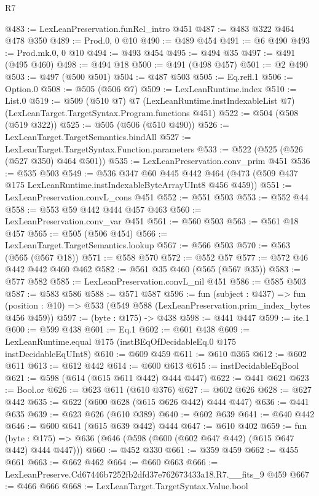 \begin{lexlean}{R7}
\begin{coremodule}
@483 := LexLeanPreservation.funRel_intro @451
@487 := @483 @322 @464 @478 @350
@489 := Prod.{0, 0} @10
@490 := @489 @454
@491 := @6 @490
@493 := Prod.mk.{0, 0} @10
@494 := @493 @454
@495 := @494 @35
@497 := @491 (@495 @460)
@498 := @494 @18
@500 := @491 (@498 @457)
@501 := @2 @490
@503 := @497 (@500 @501)
@504 := @487 @503
@505 := Eq.refl.{1}
@506 := Option.{0}
@508 := @505 (@506 @7)
@509 := LexLeanRuntime.index
@510 := List.{0}
@519 := @509
    (@510 @7)
    @7
    (LexLeanRuntime.instIndexableList @7)
    (LexLeanTarget.TargetSyntax.Program.functions @451)
@522 := @504 (@508 (@519 @322))
@525 := @505 (@506 (@510 @490))
@526 := LexLeanTarget.TargetSemantics.bindAll
@527 := LexLeanTarget.TargetSyntax.Function.parameters
@533 := @522 (@525 (@526 (@527 @350) @464 @501))
@535 := LexLeanPreservation.conv_prim @451
@536 := @535 @503
@549 := @536
    @347
    @60
    @445
    @442
    @464
    (@473 (@509 @437 @175 LexLeanRuntime.instIndexableByteArrayUInt8 @456 @459))
@551 := LexLeanPreservation.convL_cons @451
@552 := @551 @503
@553 := @552 @44
@558 := @553 @59 @442 @444 @457 @463
@560 := LexLeanPreservation.conv_var @451
@561 := @560 @503
@563 := @561 @18 @457
@565 := @505 (@506 @454)
@566 := LexLeanTarget.TargetSemantics.lookup
@567 := @566 @503
@570 := @563 (@565 (@567 @18))
@571 := @558 @570
@572 := @552 @57
@577 := @572 @46 @442 @442 @460 @462
@582 := @561 @35 @460 (@565 (@567 @35))
@583 := @577 @582
@585 := LexLeanPreservation.convL_nil @451
@586 := @585 @503
@587 := @583 @586
@588 := @571 @587
@596 := fun (subject : @437) =>
  fun (position : @10) => @533 (@549 @588 (LexLeanPreservation.prim_index_bytes @456 @459))
@597 := (byte : @175) -> @438
@598 := @441 @447
@599 := ite.{1}
@600 := @599 @438
@601 := Eq.{1}
@602 := @601 @438
@609 := LexLeanRuntime.equal @175 (instBEqOfDecidableEq.{0} @175 instDecidableEqUInt8)
@610 := @609 @459
@611 := @610 @365
@612 := @602 @611
@613 := @612 @442
@614 := @600 @613
@615 := instDecidableEqBool
@621 := @598 (@614 (@615 @611 @442) @444 @447)
@622 := @441 @621
@623 := Bool.or
@626 := @623 @611 (@610 @376)
@627 := @602 @626
@628 := @627 @442
@635 := @622 (@600 @628 (@615 @626 @442) @444 @447)
@636 := @441 @635
@639 := @623 @626 (@610 @389)
@640 := @602 @639
@641 := @640 @442
@646 := @600 @641 (@615 @639 @442) @444
@647 := @610 @402
@659 := fun (byte : @175) => @636 (@646 (@598 (@600 (@602 @647 @442) (@615 @647 @442) @444 @447)))
@660 := @452 @330
@661 := @359 @459
@662 := @455 @661
@663 := @662 @462
@664 := @660 @663
@666 := LexLeanPreserve.Cd67446b7252fb2dfd37e762673433a18.R7.__fits_9 @459
@667 := @466 @666
@668 := LexLeanTarget.TargetSyntax.Value.bool

\end{coremodule}
\end{lexlean}
